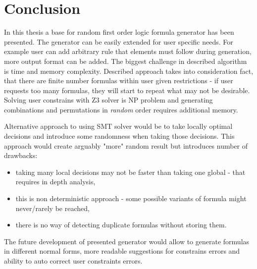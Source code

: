 \chapter{Conclusion}

In this thesis a base for random first order logic formula generator has been presented. The generator can be easily extended for user specific needs. For example user can add arbitrary rule that elements must follow during generation, more output format can be added. The biggest challenge in described algorithm is time and memory complexity. Described approach takes into consideration fact, that there are finite number formulas within user given restrictions - if user requests too many formulas, they will start to repeat what may not be desirable. Solving user constrains with Z3 solver is NP problem and generating combinations and permutations in \textit{random} order requires additional memory.

Alternative approach to using SMT solver would be to take locally optimal decisions and introduce some randomness when taking those decisions. This approach would create arguably "more" random result but introduces number of drawbacks:

\begin{itemize}
  \item taking many local decisions may not be faster than taking one global - that requires in depth analysis,
  \item this is non deterministic approach - some possible variants of formula might never/rarely be reached,
  \item there is no way of detecting duplicate formulas without storing them.
\end{itemize}

The future development of presented generator would allow to generate formulas in different normal forms, more readable suggestions for constrains errors and ability to auto correct user constraints errors.
